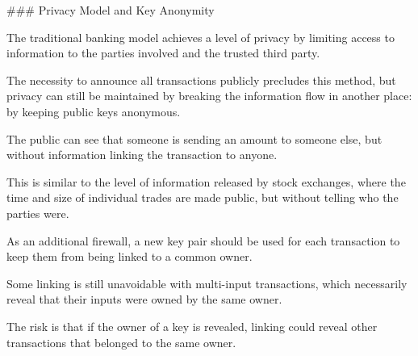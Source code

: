 ### Privacy Model and Key Anonymity

The traditional banking model achieves a level of privacy by limiting access to information to the parties involved and the trusted third party.

The necessity to announce all transactions publicly precludes this method, but privacy can still be maintained by breaking the information flow in another place: by keeping public keys anonymous.

The public can see that someone is sending an amount to someone else, but without information linking the transaction to anyone.

This is similar to the level of information released by stock exchanges, where the time and size of individual trades are made public, but without telling who the parties were.

As an additional firewall, a new key pair should be used for each transaction to keep them from being linked to a common owner.

Some linking is still unavoidable with multi-input transactions, which necessarily reveal that their inputs were owned by the same owner.

The risk is that if the owner of a key is revealed, linking could reveal other transactions that belonged to the same owner.